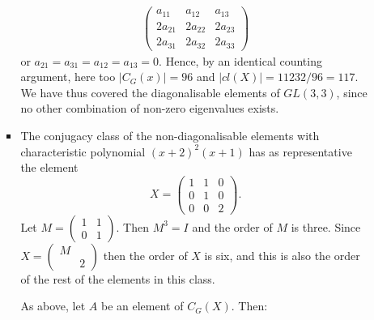 \documentclass[11pt]{article} \usepackage{amssymb}
\begin{document}
\begin{enumerate}
\begin{enumerate}
\begin{itemize}
\begin{eqnarray*}
\begin{pmatrix}
            a_{11}&a_{12}  &a_{13} \\ 
            2a_{21}&2a_{22}  &2a_{23} \\ 
            2a_{31}&2a_{32}  &2a_{33} 
          \end{pmatrix}
        \end{eqnarray*}
        or $a_{21}=a_{31}=a_{12}=a_{13}=0$. Hence, by an identical counting 
        argument, here too 
        $|C_G(x)|=96$ and $|cl(X)|=11232/96=117$. We have thus covered the diagonalisable
        elements of $GL(3,3)$, since no other combination of non-zero eigenvalues
        exists. 
      \item
        The conjugacy class of the non-diagonalisable elements with 
        characteristic polynomial
        $(x+2)^2(x+1)$ has as representative the element
        \begin{equation*}
          X=
          \begin{pmatrix}
            1&1  &0 \\ 
            0&1  &0 \\ 
            0&0  &2 
          \end{pmatrix}.
        \end{equation*}
        Let $M=\begin{pmatrix}1&1\\0&1\end{pmatrix}$. Then 
        $M^3=I$ and the order of $M$ is three. 
        Since $X=\begin{pmatrix}M&\\&2\end{pmatrix}$ then the order of $X$ is 
        six, and this is
        also the order of the rest of the elements in this class.
        
        As above, let $A$ be an element of $C_G(X)$. Then:
        

\end{itemize}
\end{enumerate}
\end{enumerate}
\end{document}
